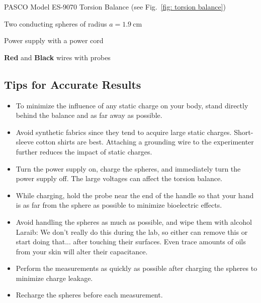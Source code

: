\documentclass[addpoints]{physlabs}
\begin{document}
\begin{labsection}
\begin{equipment}
\item PASCO Model ES-9070 Torsion Balance (see Fig.~\ref{fig: torsion balance})
\item Two conducting spheres of radius $a=\qty{1.9}{\centi\meter}$
\item Power supply with a power cord
\item {\color{red}\textbf{Red}} and \textbf{Black} wires with probes
\end{equipment}

\begin{experiment}
\subsection*{Tips for Accurate Results}
\begin{itemize}
    \item To minimize the influence of any static charge on your body, stand directly behind the balance and as far away as possible.
    \item Avoid synthetic fabrics since they tend to acquire large static charges.
    Short-sleeve cotton shirts are best. Attaching a grounding wire to the experimenter further reduces the impact of static charges.
    \item Turn the power supply on, charge the spheres, and immediately turn the power supply off.
    The large voltages can affect the torsion balance.
    \item While charging, hold the probe near the end of the handle so that your hand is as far from the sphere as possible to minimize bioelectric effects.
    \item Avoid handling the spheres as much as possible, and wipe them with alcohol {\color{red} Laraib: We don't really do this during the lab, so either can remove this or start doing that...} after touching their surfaces. Even trace amounts of oils from your skin will alter their capacitance.
    \item Perform the measurements as quickly as possible after charging the spheres to minimize charge leakage.
    \item Recharge the spheres before each measurement.
\end{itemize}


\end{experiment}
\end{labsection}
\end{document}
